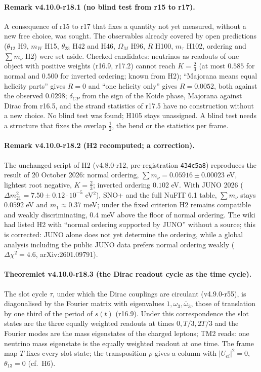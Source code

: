 \paragraph{Remark v4.10.0-r18.1 (no blind test from r15 to r17).}
A consequence of r15 to r17 that fixes a quantity not yet measured, without a new free choice, was sought.  The observables already
covered by open predictions (\(\theta_{12}\) H9, \(m_W\) H15, \(\theta_{23}\) H42 and H46, \(\Omega_M\) H96, \(R\) H100, \(m_\tau\) H102, ordering and
\(\sum m_\nu\) H2) were set aside.  Checked candidates: neutrinos as readouts of one object with positive weights (r16.9, r17.2) cannot
reach \(K=\tfrac23\) (at most \(0.585\) for normal and \(0.500\) for inverted ordering; known from H2); ``Majorana means equal helicity parts''
gives \(R=0\) and ``one helicity only'' gives \(R=0.0052\), both against the observed \(0.0298\); \(\delta_{CP}\) from the sign of the Koide phase,
Majorana against Dirac from r16.5, and the strand statistics of r17.5 have no construction without a new choice.  No blind test was
found; H105 stays unassigned.  A blind test needs a structure that fixes the overlap \(\tfrac12\), the bend or the statistics per frame.

\paragraph{Remark v4.10.0-r18.2 (H2 recomputed; a correction).}
The unchanged script of H2 (v4.8.0-r12, pre-registration \texttt{434c5a8}) reproduces the result of 20 October 2026: normal ordering,
\(\sum m_\nu=0.05916\pm0.00023\) eV, lightest root negative, \(K=\tfrac23\); inverted ordering \(0.102\) eV.  With JUNO 2026
(\(\Delta m^2_{21}=7.50\pm0.12\cdot10^{-5}\) eV\(^2\)), SNO+ and the full NuFIT 6.1 table, \(\sum m_\nu\) stays \(0.0592\) eV and \(m_1\approx0.37\) meV; under the
fixed criterion H2 remains compatible and weakly discriminating, \(0.4\) meV above the floor of normal ordering.  The wiki had listed H2
with ``normal ordering supported by JUNO'' without a source; this is corrected: JUNO alone does not yet determine the ordering, while
a global analysis including the public JUNO data prefers normal ordering weakly (\(\Delta\chi^2=4.6\), arXiv:2601.09791).

\paragraph{Theoremlet v4.10.0-r18.3 (the Dirac readout cycle as the time cycle).}
The slot cycle \(\tau\), under which the Dirac couplings are circulant (v4.9.0-r55), is diagonalised by the Fourier matrix with eigenvalues
\(1,\omega_3,\bar\omega_3\), those of translation by one third of the period of \(s(t)\) (r16.9).  Under this correspondence the slot states are
the three equally weighted readouts at times \(0,T/3,2T/3\) and the Fourier modes are the mass eigenstates of the charged leptons; TM2
reads: one neutrino mass eigenstate is the equally weighted readout at one time.  The frame map \(T\) fixes every slot state; the
transposition \(\rho\) gives a column with \(|U_{e i}|^2=0\), \(\theta_{13}=0\) (cf.\ H6).


